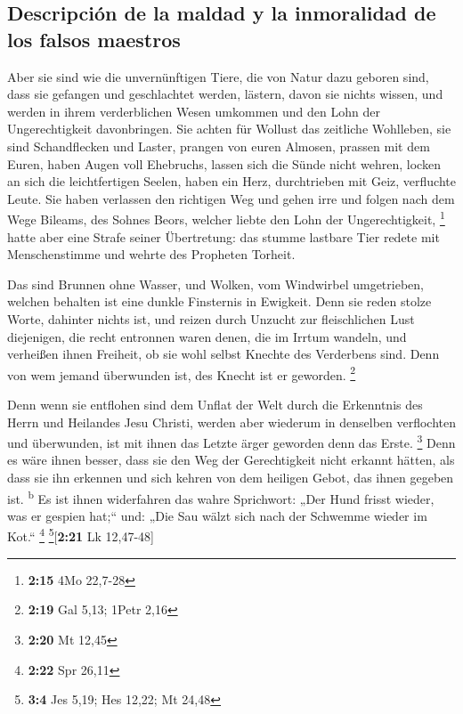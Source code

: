 \hypertarget{descripciuxf3n-de-la-maldad-y-la-inmoralidad-de-los-falsos-maestros}{%
\subsection{Descripción de la maldad y la inmoralidad de los falsos
maestros}\label{descripciuxf3n-de-la-maldad-y-la-inmoralidad-de-los-falsos-maestros}}

 Aber sie sind wie die unvernünftigen Tiere, die von
Natur dazu geboren sind, dass sie gefangen und geschlachtet werden,
lästern, davon sie nichts wissen, und werden in ihrem verderblichen
Wesen umkommen  und den Lohn der Ungerechtigkeit
davonbringen. Sie achten für Wollust das zeitliche Wohlleben, sie sind
Schandflecken und Laster, prangen von euren Almosen, prassen mit dem
Euren,  haben Augen voll Ehebruchs, lassen sich die Sünde
nicht wehren, locken an sich die leichtfertigen Seelen, haben ein Herz,
durchtrieben mit Geiz, verfluchte Leute.  Sie haben
verlassen den richtigen Weg und gehen irre und folgen nach dem Wege
Bileams, des Sohnes Beors, welcher liebte den Lohn der Ungerechtigkeit,
\footnote{\textbf{2:15} 4Mo 22,7-28}  hatte aber eine
Strafe seiner Übertretung: das stumme lastbare Tier redete mit
Menschenstimme und wehrte des Propheten Torheit.

 Das sind Brunnen ohne Wasser, und Wolken, vom Windwirbel
umgetrieben, welchen behalten ist eine dunkle Finsternis in Ewigkeit.
 Denn sie reden stolze Worte, dahinter nichts ist, und
reizen durch Unzucht zur fleischlichen Lust diejenigen, die recht
entronnen waren denen, die im Irrtum wandeln,  und
verheißen ihnen Freiheit, ob sie wohl selbst Knechte des Verderbens
sind. Denn von wem jemand überwunden ist, des Knecht ist er geworden.
\footnote{\textbf{2:19} Gal 5,13; 1Petr 2,16}

 Denn wenn sie entflohen sind dem Unflat der Welt durch
die Erkenntnis des Herrn und Heilandes Jesu Christi, werden aber
wiederum in denselben verflochten und überwunden, ist mit ihnen das
Letzte ärger geworden denn das Erste. \footnote{\textbf{2:20} Mt 12,45}
 Denn es wäre ihnen besser, dass sie den Weg der
Gerechtigkeit nicht erkannt hätten, als dass sie ihn erkennen und sich
kehren von dem heiligen Gebot, das ihnen gegeben ist.
\textsuperscript{b}  Es ist ihnen widerfahren das wahre
Sprichwort: „Der Hund frisst wieder, was er gespien hat;`` und: „Die Sau
wälzt sich nach der Schwemme wieder im Kot.`` \footnote{\textbf{2:22}
  Spr 26,11} \footnote{\textbf{3:4} Jes 5,19; Hes 12,22; Mt 24,48}{[}\textbf{2:21}
Lk 12,47-48{]}


